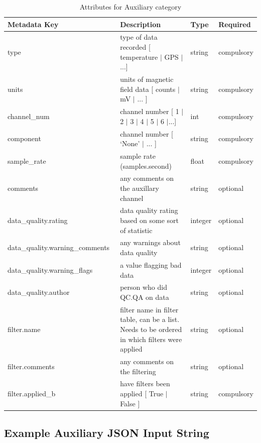 \documentclass{article}
\begin{document}
\begin{table}[htb!]
    \caption[Attributes for Auxiliary Channel]{Attributes for Auxiliary category}
    \begin{tabular}{|l|p{3in}|l|l|}
        \hline
        \textbf{Metadata Key} & \textbf{Description} & \textbf{Type} & \textbf{Required} \\ \hline
        type\ & type of data recorded [ temperature $|$ GPS $|$ ...] & string & compulsory \\ \hline
        units\ & units of magnetic field data [ counts $|$ mV $|$ ... ] & string &  compulsory \\ \hline
        channel\_num\ & channel number [ 1 $|$ 2 $|$ 3 $|$ 4 $|$ 5 $|$ 6 $|$...] & int &  compulsory \\ \hline
        component\ & channel number [ `None' $|$ ... ] & string &  compulsory \\ \hline
        sample\_rate\ & sample rate (samples.second) & float &  compulsory \\ \hline
        comments\ & any comments on the auxillary channel & string &  optional \\ \hline
        data\_quality.rating\ & data quality rating based on some sort of statistic & integer &  optional \\ \hline
        data\_quality.warning\_comments\ & any warnings about data quality & string &   optional \\ \hline
        data\_quality.warning\_flags\ & a value flagging bad data  & integer &  optional \\ \hline
        data\_quality.author\ & person who did QC.QA on data & string &   optional \\ \hline
        filter.name\ & filter name in filter table, can be a list. Needs to be ordered in which filters were applied & string &  optional \\ \hline
        filter.comments\ & any comments on the filtering & string &  optional \\ \hline
        filter.applied\_b & have filters been applied [ True $|$ False ] & string & compulsory \\ \hline
    \end{tabular}
    \label{tab:aux}
\end{table}

\subsection{Example Auxiliary JSON Input String} 
\end{document}
